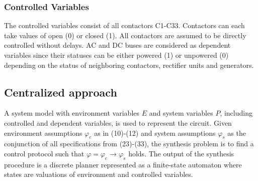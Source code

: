 \documentclass[journal]{IEEEtran}
\begin{document}
\subsubsection{Controlled Variables}
The controlled variables consist of all contactors C1-C33. Contactors can each take values of open (0) or closed (1). All contactors are assumed to be directly controlled without delays. AC and DC buses are considered as dependent variables since their statuses can be either powered (1) or unpowered (0) depending on the status of neighboring contactors, rectifier units and generators.
%  


\subsection{Centralized approach}
A system model with environment variables $E$ and system variables $P$, including controlled and dependent variables, is used to represent the circuit. Given environment assumptions $\varphi_{e}$ as in (10)-(12) and system assumptions $\varphi_{s}$ as the conjunction of all specifications from (23)-(33), the synthesis problem is to find a control protocol such that $\varphi= \varphi_{e} \rightarrow \varphi_{s}$ holds. The output of the synthesis procedure is a discrete planner represented as a finite-state automaton where states are valuations of environment and controlled variables. 
\end{document}
